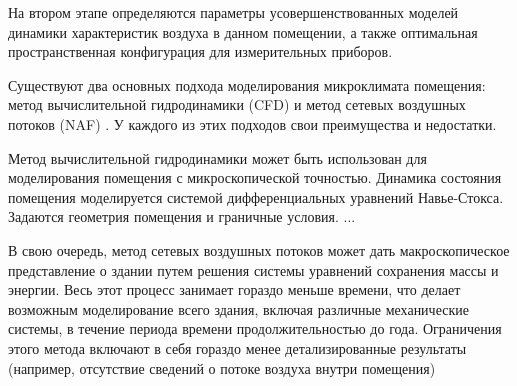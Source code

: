 На втором этапе определяются параметры усовершенствованных моделей динамики характеристик воздуха в данном помещении, а также оптимальная пространственная конфигурация для измерительных приборов.


\newpage


Существуют два основных подхода моделирования микроклимата помещения: метод вычислительной гидродинамики (CFD) и метод сетевых воздушных потоков (NAF) \cite{ashrae}. У каждого из этих подходов свои преимущества и недостатки.

Метод вычислительной гидродинамики может быть использован для моделирования помещения с микроскопической точностью. Динамика состояния помещения моделируется системой дифференциальных уравнений Навье-Стокса. Задаются геометрия помещения и граничные условия. ...

В свою очередь, метод сетевых воздушных потоков может дать макроскопическое представление о здании путем решения системы уравнений сохранения массы и энергии. Весь этот процесс занимает гораздо меньше времени, что делает возможным моделирование всего здания, включая различные механические системы, в течение периода времени продолжительностью до года. Ограничения этого метода включают в себя гораздо менее детализированные результаты (например, отсутствие сведений о потоке воздуха внутри помещения)

